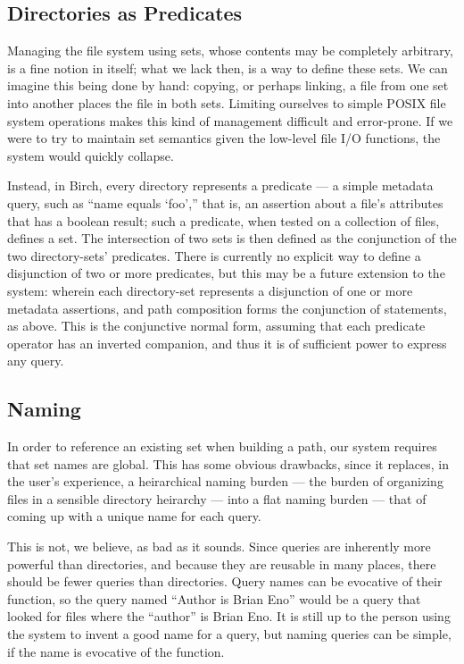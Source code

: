 \documentclass{article}
\begin{document}
\subsection{Directories as Predicates}

Managing the file system using sets, whose contents may be completely
arbitrary, is a fine notion in itself; what we lack then, is a way to
define these sets. We can imagine this being done by hand: copying, or
perhaps linking, a file from one set into another places the file in
both sets. Limiting ourselves to simple POSIX file system operations
makes this kind of management difficult and error-prone. If we were to
try to maintain set semantics given the low-level file I/O functions,
the system would quickly collapse.

Instead, in Birch, every directory represents a predicate --- a simple
metadata query, such as ``name equals `foo','' that is, an assertion
about a file's attributes that has a boolean result; such a predicate,
when tested on a collection of files, defines a set. The intersection
of two sets is then defined as the conjunction of the two
directory-sets' predicates. There is currently no explicit way to
define a disjunction of two or more predicates, but this may be a
future extension to the system: wherein each directory-set represents
a disjunction of one or more metadata assertions, and path composition
forms the conjunction of statements, as above. This is the conjunctive
normal form, assuming that each predicate operator has an inverted
companion, and thus it is of sufficient power to express any query.

\subsection{Naming}

In order to reference an existing set when building a path, our system
requires that set names are global. This has some obvious drawbacks,
since it replaces, in the user's experience, a heirarchical naming
burden --- the burden of organizing files in a sensible directory
heirarchy --- into a flat naming burden --- that of coming up with a
unique name for each query.

This is not, we believe, as bad as it sounds. Since queries are
inherently more powerful than directories, and because they are
reusable in many places, there should be fewer queries than
directories. Query names can be evocative of their function, so the
query named ``Author is Brian Eno'' would be a query that looked for
files where the ``author'' is Brian Eno. It is still up to the person
using the system to invent a good name for a query, but naming queries
can be simple, if the name is evocative of the function. 
\end{document}
